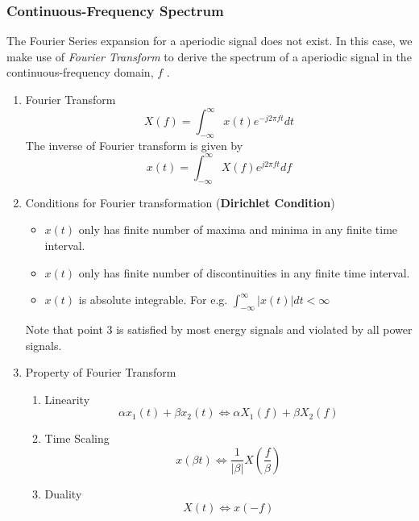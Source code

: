 \subsubsection{Continuous-Frequency Spectrum} 
The Fourier Series expansion for a aperiodic signal does not exist. In this case, we make use of \textit{Fourier Transform} to derive the spectrum of a aperiodic signal in the continuous-frequency domain, $f$ .
\begin{enumerate}
    \item Fourier Transform \\
    \begin{equation}
        X(f) = \int^{\infty}_{-\infty}x(t)e^{-j2\pi ft}dt
    \end{equation}
    The inverse of Fourier transform is given by
    \begin{equation}
        x(t) = \int^{\infty}_{-\infty}X(f)e^{j2\pi ft}df
    \end{equation}
    \item Conditions for Fourier transformation (\textbf{Dirichlet Condition})
    \begin{itemize}
        \item $x(t)$ only has finite number of maxima and minima in any finite time interval.
        \item $x(t)$ only has finite number of discontinuities in any finite time interval.
        \item $x(t)$ is absolute integrable. For e.g. $\int^{\infty}_{-\infty}|x(t)| dt < \infty$
    \end{itemize}
    Note that point 3 is satisfied by most energy signals and violated by all power signals.
    \item Property of Fourier Transform
    \begin{enumerate}
        \item Linearity
        \begin{equation}
            \alpha x_1(t)+\beta x_2(t) \Longleftrightarrow \alpha X_1(f) + \beta X_2(f)
        \end{equation}
        \item Time Scaling
        \begin{equation}
            x(\beta t) \Longleftrightarrow \frac{1}{|\beta|}X(\frac{f}{\beta})
        \end{equation}
        \item Duality
        \begin{equation}
            X(t) \Longleftrightarrow x(-f)
        \end{equation}

\end{enumerate}
\end{enumerate}
